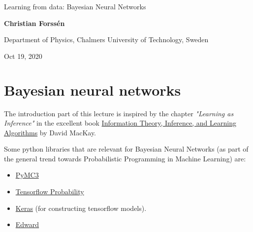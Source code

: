 \documentclass[%
oneside,                 %
final,                   %
10pt]{article}
\begin{document}

\newcommand{\exercisesection}[1]{\subsection*{#1}}







\thispagestyle{empty}

\begin{center}
{\LARGE\bf
\begin{spacing}{1.25}
Learning from data: Bayesian Neural Networks
\end{spacing}
}
\end{center}


\begin{center}
{\bf Christian Forssén}
\end{center}

    \begin{center}
\centerline{{\small Department of Physics, Chalmers University of Technology, Sweden}}
\end{center}
    

\begin{center}
Oct 19, 2020
\end{center}

\vspace{1cm}


\section{Bayesian neural networks}
The introduction part of this lecture is inspired by the chapter \emph{"Learning as Inference"} in the excellent book \href{{http://www.inference.org.uk/mackay/itila/}}{Information Theory, Inference, and Learning Algorithms} by David MacKay.

Some python libraries that are relevant for Bayesian Neural Networks (as part of the general trend towards Probabilistic Programming in Machine Learning) are:
\begin{itemize}
\item \href{{https://docs.pymc.io/}}{PyMC3}

\item \href{{https://www.tensorflow.org/probability}}{Tensorflow Probability}

\item \href{{https://keras.io/}}{Keras} (for constructing tensorflow models).

\item \href{{http://edwardlib.org/}}{Edward}
\end{itemize}
\end{document}
